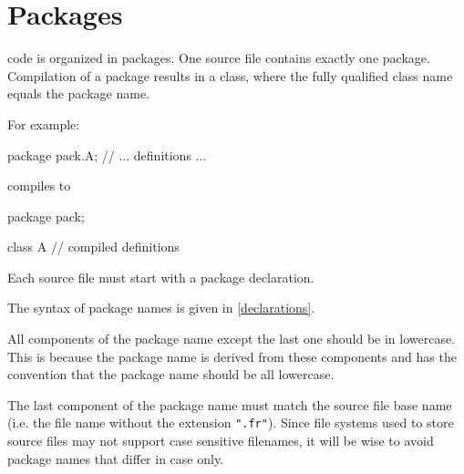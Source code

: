 %
%
%
%
%
%
%


\chapter{Packages} \label{packages} 

\frege{} code is organized in packages. One source file contains
exactly one package. Compilation of a package results in a \java{}
class, where the fully qualified class name equals the \frege{} package name.

For example:

\begin{code}
package pack.A;
// ... definitions ...
\end{code}

compiles to

\begin{code}
package pack;

class A {
    // compiled definitions
}
\end{code}


Each source file must start with a package declaration.

The syntax of package names is given in \autoref{declarations}.

All components of the package name
except the last one should be in lowercase. This is because the \java{}
package name is derived from these components and \java{} has the
convention that the package name should be all lowercase.

The last component of the package name must match the source file
base name (i.e. the file name without the extension {\tt ".fr"}).
Since file systems used to store \frege{} source files may not support
case sensitive filenames, it will be wise to avoid package
names that differ in case only.

